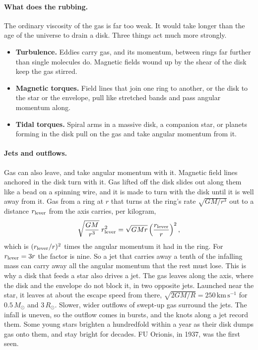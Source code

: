 \paragraph{What does the rubbing.} The ordinary viscosity of the gas is far too weak. It would take longer than the age of the universe to drain a disk. Three things act much more strongly.
\begin{itemize}
	\item \textbf{Turbulence.} Eddies carry gas, and its momentum, between rings far further than single molecules do. Magnetic fields wound up by the shear of the disk keep the gas stirred.
	\item \textbf{Magnetic torques.} Field lines that join one ring to another, or the disk to the star or the envelope, pull like stretched bands and pass angular momentum along.
	\item \textbf{Tidal torques.} Spiral arms in a massive disk, a companion star, or planets forming in the disk pull on the gas and take angular momentum from it.
\end{itemize}

\paragraph{Jets and outflows.} Gas can also leave, and take angular momentum with it. Magnetic field lines anchored in the disk turn with it. Gas lifted off the disk slides out along them like a bead on a spinning wire, and it is made to turn with the disk until it is well away from it. Gas from a ring at $r$ that turns at the ring's rate $\sqrt{GM/r^3}$ out to a distance $r_{\rm lever}$ from the axis carries, per kilogram,
\[
\sqrt{\frac{GM}{r^3}}\;r_{\rm lever}^2=\sqrt{GMr}\left(\frac{r_{\rm lever}}{r}\right)^2,
\]
which is $(r_{\rm lever}/r)^2$ times the angular momentum it had in the ring. For $r_{\rm lever}=3r$ the factor is nine. So a jet that carries away a tenth of the infalling mass can carry away all the angular momentum that the rest must lose. This is why a disk that feeds a star also drives a jet. The gas leaves along the axis, where the disk and the envelope do not block it, in two opposite jets. Launched near the star, it leaves at about the escape speed from there, $\sqrt{2GM/R}=250\,\mathrm{km\,s^{-1}}$ for $0.5\,M_\odot$ and $3\,R_\odot$. Slower, wider outflows of swept-up gas surround the jets. The infall is uneven, so the outflow comes in bursts, and the knots along a jet record them. Some young stars brighten a hundredfold within a year as their disk dumps gas onto them, and stay bright for decades. FU Orionis, in 1937, was the first seen.

